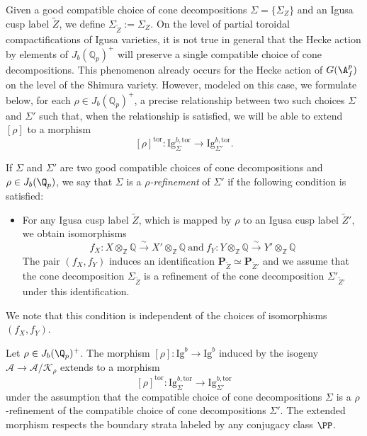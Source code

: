 \documentclass[letterpaper,11pt]{amsart}
\begin{document}
Given a good compatible choice of cone decompositions $\Sigma = \{\Sigma_{Z}\}$ and an Igusa cusp label $\widetilde{Z}$, we define $\Sigma_{\widetilde{Z}}:= \Sigma_Z$. On the level of partial toroidal compactifications of Igusa varieties, it is not true in general that the Hecke action by elements of $J_b(\mathbb{Q}_p)^+$ will preserve a single compatible choice of cone decompositions. This phenomenon already occurs for the Hecke action of $G(\A_f^p)$ on the level of the Shimura variety. However, modeled on this case, we formulate below, for each $\rho\in J_b(\mathbb{Q}_p)^+$, a precise relationship between two such choices $\Sigma$ and $\Sigma'$ such that, when the relationship is satisfied, we will be able to extend $[\rho]$ to a morphism 
\[
[\rho]^{\mathrm{tor}}:\mathrm{Ig}^{b,\mathrm{tor}}_{\Sigma}\to \mathrm{Ig}^{b,\mathrm{tor}}_{\Sigma'}.
\]

\begin{definition}\label{defn:rho-refinement} If $\Sigma$ and $\Sigma'$ are two good compatible choices of cone decompositions and $\rho\in J_b(\Q_p)$, we say that $\Sigma$ is a \emph{$\rho$-refinement} of $\Sigma'$ if the following condition is satisfied:
\begin{itemize}
\item For any Igusa cusp label $\widetilde{Z}$, which is mapped by $\rho$ to an Igusa cusp label $\widetilde{Z}'$, we obtain isomorphisms 
\[
f_X:X\otimes_{\mathbb{Z}} \mathbb{Q}\stackrel{\sim}{\to} X'\otimes_{\mathbb{Z}} \mathbb{Q}\  \mathrm{and} \ 
f_Y:Y\otimes_{\mathbb{Z}} \mathbb{Q}\stackrel{\sim}{\to}  Y'\otimes_{\mathbb{Z}} \mathbb{Q}
\]
The pair $(f_X, f_Y)$ induces an identification $\mathbf{P}_{{\widetilde{Z}}}\simeq \mathbf{P}_{{\widetilde{Z}'}}$ 
and we assume that the cone decomposition $\Sigma_{\widetilde{Z}}$ is a refinement of the cone decomposition $\Sigma'_{\widetilde{Z}'}$ under this identification.   
\end{itemize}
We note that this condition is independent of the choices of isomorphisms $(f_X,f_Y)$. 
\end{definition}

\begin{proposition}\label{prop: HeckeAction}
    Let $\rho\in J_b(\Q_p)^+$. The morphism $[\rho]:\mathrm{Ig}^b\to \mathrm{Ig}^b$ induced by the isogeny $\mathcal{A}\to \mathcal{A}/\mathcal{K}_{\rho}$ extends to a morphism 
    \[
    [\rho]^{\mathrm{tor}}: \mathrm{Ig}^{b,\mathrm{tor}}_{\Sigma} \to \mathrm{Ig}^{b,\mathrm{tor}}_{\Sigma'} 
    \] 
    under the assumption that the compatible choice of cone decompositions $\Sigma$ is a $\rho$-refinement of the compatible choice of cone decompositions $\Sigma'$. The extended morphism respects the boundary strata labeled by any conjugacy class $\PP$. 
\end{proposition}
\end{document}
